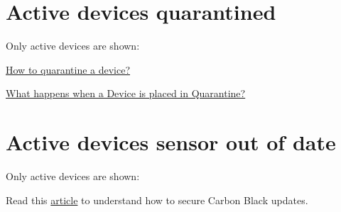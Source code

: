 %



%



\section{Active devices quarantined}

Only \gls{active} devices are shown:



\begin{tipblock}
 \href{https://community.carbonblack.com/t5/Knowledge-Base/Carbon-Black-Cloud-How-to-Quarantine-a-Device-from-the-Carbon/ta-p/71739}{How to quarantine a device?}
\end{tipblock}

\begin{tipblock}
	\href{https://community.carbonblack.com/t5/Knowledge-Base/Endpoint-Standard-What-happens-when-a-Device-is-placed-in/ta-p/71741}{What happens when a Device is placed in Quarantine?}
\end{tipblock}


\section{Active devices sensor out of date}

Only \gls{active} devices are shown:



Read this \href{https://carbonblack.vmware.com/resource/secure-carbon-black-cloud-updates}{article} to understand how to secure Carbon Black updates.\\
